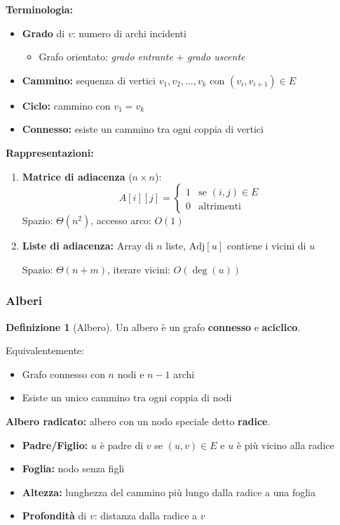 \documentclass[a4paper, 11pt]{article}
\theoremstyle{definition}
\newtheorem{definizione}{Definizione}[section]
\theoremstyle{remark}
\theoremstyle{remark}
\begin{document}
	\textbf{Terminologia:}
	\begin{itemize}
		\item \textbf{Grado} di $v$: numero di archi incidenti
		\begin{itemize}
			\item Grafo orientato: \textit{grado entrante} + \textit{grado uscente}
		\end{itemize}
		\item \textbf{Cammino:} sequenza di vertici $v_1, v_2, \ldots, v_k$ con $(v_i, v_{i+1}) \in E$
		\item \textbf{Ciclo:} cammino con $v_1 = v_k$
		\item \textbf{Connesso:} esiste un cammino tra ogni coppia di vertici
	\end{itemize}
	
	\textbf{Rappresentazioni:}
	\begin{enumerate}
		\item \textbf{Matrice di adiacenza} ($n \times n$):
		\[
		A[i][j] = \begin{cases}
			1 & \text{se } (i,j) \in E \\
			0 & \text{altrimenti}
		\end{cases}
		\]
		Spazio: $\Theta(n^2)$, accesso arco: $O(1)$
		
		\item \textbf{Liste di adiacenza:}
		Array di $n$ liste, $\text{Adj}[u]$ contiene i vicini di $u$
		
		Spazio: $\Theta(n + m)$, iterare vicini: $O(\deg(u))$
	\end{enumerate}
	
	\subsubsection{Alberi}
	
	\begin{definizione}[Albero]
		Un albero è un grafo \textbf{connesso} e \textbf{aciclico}.
		
		Equivalentemente:
		\begin{itemize}
			\item Grafo connesso con $n$ nodi e $n-1$ archi
			\item Esiste un unico cammino tra ogni coppia di nodi
		\end{itemize}
	\end{definizione}
	
	\textbf{Albero radicato:} albero con un nodo speciale detto \textbf{radice}.
	\begin{itemize}
		\item \textbf{Padre/Figlio:} $u$ è padre di $v$ se $(u,v) \in E$ e $u$ è più vicino alla radice
		\item \textbf{Foglia:} nodo senza figli
		\item \textbf{Altezza:} lunghezza del cammino più lungo dalla radice a una foglia
		\item \textbf{Profondità} di $v$: distanza dalla radice a $v$
	\end{itemize}
	
\end{document}
